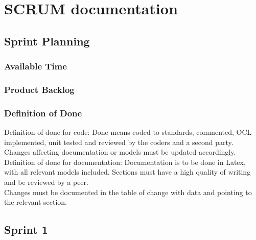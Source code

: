 \chapter{SCRUM documentation}

\section{Sprint Planning}



\subsection{Available Time}
\label{sec:Available Time}


\subsection{Product Backlog}
\label{sec:Product Backlog}



\subsection{Definition of Done}
\label{sec:Definition of Done}
Definition of done for code:
Done means coded to standards, commented, OCL implemented, unit tested and reviewed by the coders and a second party. Changes affecting documentation or models must be updated accordingly. \\


\noindent Definition of done for documentation:
Documentation is to be done in Latex, with all relevant models included. Sections must have a high quality of writing and be reviewed by a peer. \\
Changes must be documented in the table of change with data and pointing to the relevant section.

\newpage
\section{Sprint 1}
\label{chap:Spring 1}


